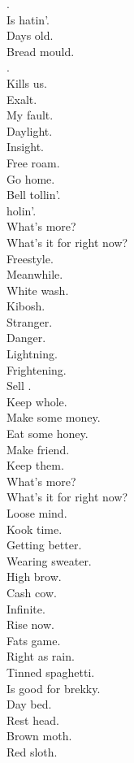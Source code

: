 . \\
Is hatin'. \\
Days old. \\
Bread mould. \\
. \\
Kills us. \\
Exalt. \\
My fault. \\

Daylight. \\
Insight. \\
Free roam. \\
Go home. \\
Bell tollin'. \\
 holin'. \\
What's more? \\
What's it for right now? \\

Freestyle. \\
Meanwhile. \\
White wash. \\
Kibosh. \\
Stranger. \\
Danger. \\
Lightning. \\
Frightening. \\

Sell . \\
Keep whole. \\
Make some money. \\
Eat some honey. \\
Make friend. \\
Keep them. \\
What's more? \\
What's it for right now? \\

Loose mind. \\
Kook time. \\
Getting better. \\
Wearing sweater. \\
High brow. \\
Cash cow. \\
Infinite. \\
Rise now. \\

Fats game. \\
Right as rain. \\
Tinned spaghetti. \\
Is good for brekky. \\
Day bed. \\
Rest head. \\
Brown moth. \\
Red sloth. \\

